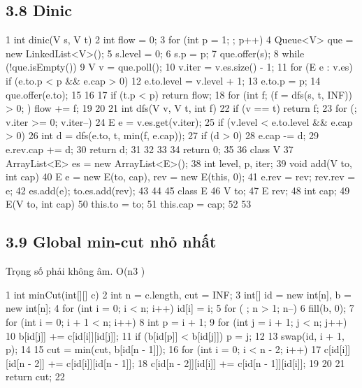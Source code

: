 \documentclass[11pt]{article}
\begin{document}
\subsection{3.8 Dinic}
\begin{Code}
1 int dinic(V s, V t) {
2 int flow = 0;
3 for (int p = 1; ; p++) {
4 Queue<V> que = new LinkedList<V>();
5 s.level = 0;
6 s.p = p;
7 que.offer(s);
8 while (!que.isEmpty()) {
9 V v = que.poll();
10 v.iter = v.es.size() - 1;
11 for (E e : v.es) if (e.to.p < p && e.cap > 0) {
12 e.to.level = v.level + 1;
13 e.to.p = p;
14 que.offer(e.to);
15 }
16 }
17 if (t.p < p) return flow;
18 for (int f; (f = dfs(s, t, INF)) > 0; ) flow += f;
19 }
20 }
21 int dfs(V v, V t, int f) {
22 if (v == t) return f;
23 for (; v.iter >= 0; v.iter--) {
24 E e = v.es.get(v.iter);
25 if (v.level < e.to.level && e.cap > 0) {
26 int d = dfs(e.to, t, min(f, e.cap));
27 if (d > 0) {
28 e.cap -= d;
29 e.rev.cap += d;
30 return d;
31 }
32 }
33 }
34 return 0;
35 }
36 class V {
37 ArrayList<E> es = new ArrayList<E>();
38 int level, p, iter;
39 void add(V to, int cap) {
40 E e = new E(to, cap), rev = new E(this, 0);
41 e.rev = rev; rev.rev = e;
42 es.add(e); to.es.add(rev);
43 }
44 }
45 class E {
46 V to;
47 E rev;
48 int cap;
49 E(V to, int cap) {
50 this.to = to;
51 this.cap = cap;
52 }
53 }
\end{Code}
\subsection{3.9 Global min-cut nhỏ nhất}
\begin{NoteBlock}
Trọng số phải không âm.
O(n3
)
\end{NoteBlock}
\begin{Code}
1 int minCut(int[][] c) {
2 int n = c.length, cut = INF;
3 int[] id = new int[n], b = new int[n];
4 for (int i = 0; i < n; i++) id[i] = i;
5 for ( ; n > 1; n--) {
6 fill(b, 0);
7 for (int i = 0; i + 1 < n; i++) {
8 int p = i + 1;
9 for (int j = i + 1; j < n; j++) {
10 b[id[j]] += c[id[i]][id[j]];
11 if (b[id[p]] < b[id[j]]) p = j;
12 }
13 swap(id, i + 1, p);
14 }
15 cut = min(cut, b[id[n - 1]]);
16 for (int i = 0; i < n - 2; i++) {
17 c[id[i]][id[n - 2]] += c[id[i]][id[n - 1]];
18 c[id[n - 2]][id[i]] += c[id[n - 1]][id[i]];
19 }
20 }
21 return cut;
22 }
\end{Code}
\end{document}
